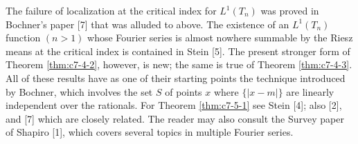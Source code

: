 The failure of localization at the critical index for $L^1(T_n)$ was proved in Bochner's paper [7] that was alluded to above. The existence of an $L^1(T_n)$ function $(n > 1)$ whose Fourier series is almost nowhere summable by the Riesz means at the critical index is contained in Stein [5]. The present stronger form of Theorem \ref{thm:c7-4-2}, however, is new; the same is true of Theorem \ref{thm:c7-4-3}. All of these results have as one of their starting points the technique introduced by Bochner, which involves the set $S$ of points $x$ where $\{|x - m|\}$ are linearly independent over the rationals. For Theorem \ref{thm:c7-5-1} see Stein [4]; also [2], and [7] which are closely related. The reader may also consult the Survey paper of Shapiro [1], which covers several topics in multiple Fourier series.

